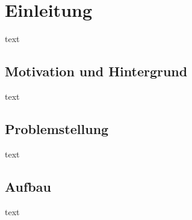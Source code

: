 \section{Einleitung}
text
\subsection{Motivation und Hintergrund}
text
\subsection{Problemstellung}
text
\subsection{Aufbau}
text